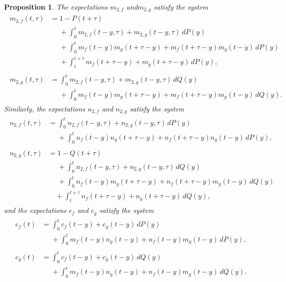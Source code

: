 \documentclass[12pt]{amsart}
\theoremstyle{plain}
\newtheorem{prop}[thm]{Proposition}
\theoremstyle{definition}
\theoremstyle{remark}
\theoremstyle{definition}
\begin{document}
\begin{prop}
The expectations $m_{2,f}$ and$m_{2,g}$ satisfy the system
\begin{gather}
\begin{aligned}
m_{2,f}(t,\tau) & = 1-P(t+\tau) \\
& \phantom{{}={}} + \int_0^t m_{2,f}(t-y,\tau) + m_{2,g}(t-y,\tau) \, dP(y) \\
& \phantom{{}={}} + \int_0^t m_f(t-y)m_g(t+\tau-y)+m_f(t+\tau-y)m_g(t-y) \, dP(y) \\
& \phantom{{}={}} + \int_t^{t+\tau} m_f(t+\tau-y) + m_g(t+\tau-y) \, dP(y), \label{m2f}
\end{aligned} \\
\begin{aligned}
m_{2,g}(t,\tau) & = \int_0^t m_{2,f}(t-y,\tau) + m_{2,g}(t-y,\tau) \, dQ(y) \\
& \phantom{{}={}} + \int_0^t m_f(t-y)m_g(t+\tau-y)+m_f(t+\tau-y)m_g(t-y) \, dQ(y). \label{m2g}
\end{aligned}
\end{gather}
Similarly, the expectations $n_{2,f}$ and $n_{2,g}$ satisfy the system
\begin{gather}
\begin{aligned}
n_{2,f}(t,\tau) & = \int_0^t n_{2,f}(t-y,\tau) + n_{2,g}(t-y,\tau) \, dP(y) \\
& \phantom{{}={}} + \int_0^t n_f(t-y)n_g(t+\tau-y)+n_f(t+\tau-y)n_g(t-y) \, dP(y), \label{n2f}
\end{aligned} \\
\begin{aligned}
n_{2,g}(t,\tau) & = 1-Q(t+\tau) \\
& \phantom{{}={}} + \int_0^t n_{2,f}(t-y,\tau) + n_{2,g}(t-y,\tau) \, dQ(y) \\
& \phantom{{}={}} + \int_0^t n_f(t-y)m_g(t+\tau-y)+n_f(t+\tau-y)m_g(t-y) \, dQ(y) \nonumber \\
& \quad + \int_t^{t+\tau} n_f(t+\tau-y) + n_g(t+\tau-y) \, dQ(y), \label{n2g}
\end{aligned}
\end{gather}
and the expectations $c_{f}$ and $c_{g}$ satisfy the system
\begin{gather}
\begin{aligned}
c_{f}(t) & = \int_0^t c_{f}(t-y) + c_{g}(t-y) \, dP(y) \nonumber \\
& \phantom{{}={}} + \int_0^t m_f(t-y)n_g(t-y)+n_f(t-y)m_g(t-y) \, dP(y), \label{cf}
\end{aligned} \\
\begin{aligned}
c_{g}(t) & = \int_0^t c_{f}(t-y) + c_{g}(t-y) \, dQ(y) \nonumber \\
& \phantom{{}={}} + \int_0^t m_f(t-y)n_g(t-y)+n_f(t-y)m_g(t-y) \, dQ(y). \label{cg}
\end{aligned}
\end{gather}
\end{prop}
\end{document}
